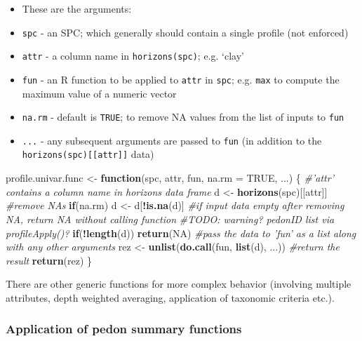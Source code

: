 \documentclass[]{article}
\newenvironment{Shaded}{\begin{snugshade}}{\end{snugshade}}
\newcommand{\KeywordTok}[1]{\textcolor[rgb]{0.13,0.29,0.53}{\textbf{#1}}}
\newcommand{\DataTypeTok}[1]{\textcolor[rgb]{0.13,0.29,0.53}{#1}}
\newcommand{\StringTok}[1]{\textcolor[rgb]{0.31,0.60,0.02}{#1}}
\newcommand{\CommentTok}[1]{\textcolor[rgb]{0.56,0.35,0.01}{\textit{#1}}}
\newcommand{\OtherTok}[1]{\textcolor[rgb]{0.56,0.35,0.01}{#1}}
\newcommand{\ControlFlowTok}[1]{\textcolor[rgb]{0.13,0.29,0.53}{\textbf{#1}}}
\newcommand{\OperatorTok}[1]{\textcolor[rgb]{0.81,0.36,0.00}{\textbf{#1}}}
\newcommand{\NormalTok}[1]{#1}
\providecommand{\tightlist}{%
  \setlength{\itemsep}{0pt}\setlength{\parskip}{0pt}}
\begin{document}
\begin{itemize}
\tightlist
\item
  These are the arguments:
\item
  \texttt{spc} - an SPC; which generally should contain a single profile
  (not enforced)
\item
  \texttt{attr} - a column name in \texttt{horizons(spc)}; e.g. `clay'
\item
  \texttt{fun} - an R function to be applied to \texttt{attr} in
  \texttt{spc}; e.g. \texttt{max} to compute the maximum value of a
  numeric vector
\item
  \texttt{na.rm} - default is \texttt{TRUE}; to remove NA values from
  the list of inputs to \texttt{fun}
\item
  \texttt{...} - any subsequent arguments are passed to \texttt{fun} (in
  addition to the \texttt{horizons(spc){[}{[}attr{]}{]}} data)
\end{itemize}

\begin{Shaded}
\begin{Highlighting}[]
\NormalTok{profile.univar.func <-}\StringTok{ }\ControlFlowTok{function}\NormalTok{(spc, attr, fun, }\DataTypeTok{na.rm =} \OtherTok{TRUE}\NormalTok{, ...) \{}
  \CommentTok{#'attr' contains a column name in horizons data frame}
\NormalTok{  d <-}\StringTok{ }\KeywordTok{horizons}\NormalTok{(spc)[[attr]]}
  \CommentTok{#remove NAs}
  \ControlFlowTok{if}\NormalTok{(na.rm)}
\NormalTok{    d <-}\StringTok{ }\NormalTok{d[}\OperatorTok{!}\KeywordTok{is.na}\NormalTok{(d)]}
  \CommentTok{#if input data empty after removing NA, return NA without calling function}
  \CommentTok{#TODO: warning? pedonID list via profileApply()?}
  \ControlFlowTok{if}\NormalTok{(}\OperatorTok{!}\KeywordTok{length}\NormalTok{(d)) }
    \KeywordTok{return}\NormalTok{(}\OtherTok{NA}\NormalTok{)}
  \CommentTok{#pass the data to 'fun' as a list along with any other arguments}
\NormalTok{  rez <-}\StringTok{ }\KeywordTok{unlist}\NormalTok{(}\KeywordTok{do.call}\NormalTok{(fun, }\KeywordTok{list}\NormalTok{(d), ...))}
  \CommentTok{#return the result}
  \KeywordTok{return}\NormalTok{(rez)}
\NormalTok{\}}
\end{Highlighting}
\end{Shaded}

There are other generic functions for more complex behavior (involving
multiple attributes, depth weighted averaging, application of taxonomic
criteria etc.).

\subsubsection{Application of pedon summary
functions}\label{application-of-pedon-summary-functions}
\end{document}
